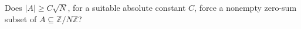 Does $|A|\geq C\sqrt N$, for a suitable absolute constant $C$, force a nonempty zero-sum subset of $A\subseteq\mathbb Z/N\mathbb Z$?
